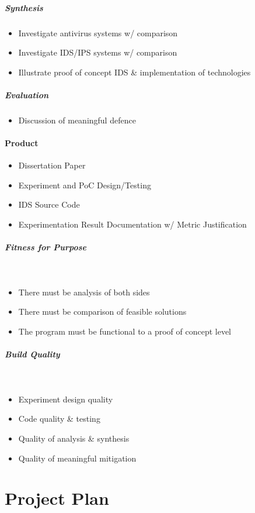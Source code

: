 \subparagraph{Synthesis}
\begin{itemize}
	\item Investigate antivirus systems w/ comparison
	\item Investigate IDS/IPS systems w/ comparison
	\item Illustrate proof of concept IDS \& implementation of technologies
\end{itemize}

\subparagraph{Evaluation}
\begin{itemize}
	\item Discussion of meaningful defence
\end{itemize}

\paragraph{Product}
\begin{itemize}
	\item Dissertation Paper
	\item Experiment and PoC Design/Testing
	\item IDS Source Code
	\item Experimentation Result Documentation w/ Metric Justification
\end{itemize}

\subparagraph{Fitness for Purpose}~
\begin{itemize}
	\item There must be analysis of both sides
	\item There must be comparison of feasible solutions
	\item The program must be functional to a proof of concept level
\end{itemize}

\subparagraph{Build Quality}~
\begin{itemize}
	\item Experiment design quality
	\item Code quality \& testing
	\item Quality of analysis \& synthesis
	\item Quality of meaningful mitigation
\end{itemize}
\section{Project Plan}
\noindent
{}

